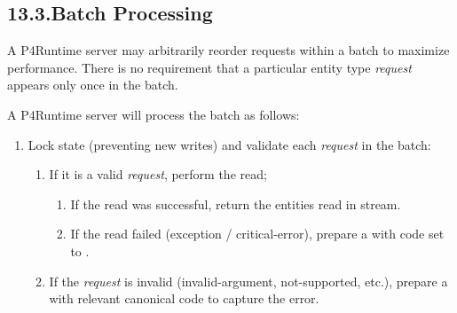 \documentclass[11pt]{article}
\begin{document}
{%
\subsection{13.3.\hspace*{0.5em}Batch Processing}\label{sec-batch-processing}%

\noindent{}A P4Runtime server may arbitrarily reorder requests within a batch to maximize
performance. There is no requirement that a particular entity type \emph{request}
appears only once in the batch.%

A P4Runtime server will process the batch as follows:%

\begin{enumerate}%

\item{}
Lock state (preventing new writes) and validate each \emph{request} in the batch:%

\begin{enumerate}%

\item{}
If it is a valid \emph{request}, perform the read;%

\begin{enumerate}[noitemsep,topsep=\mdcompacttopsep]%

\item{}If the read was successful, return the entities read in
 stream.%

\item{}If the read failed (exception / critical-error), prepare a 
with code set to .%
\end{enumerate}%

\item{}
If the \emph{request} is invalid (invalid-argument, not-supported, etc.),
prepare a  with relevant canonical code to capture the error.%
\end{enumerate}%


\end{enumerate}}
\end{document}
